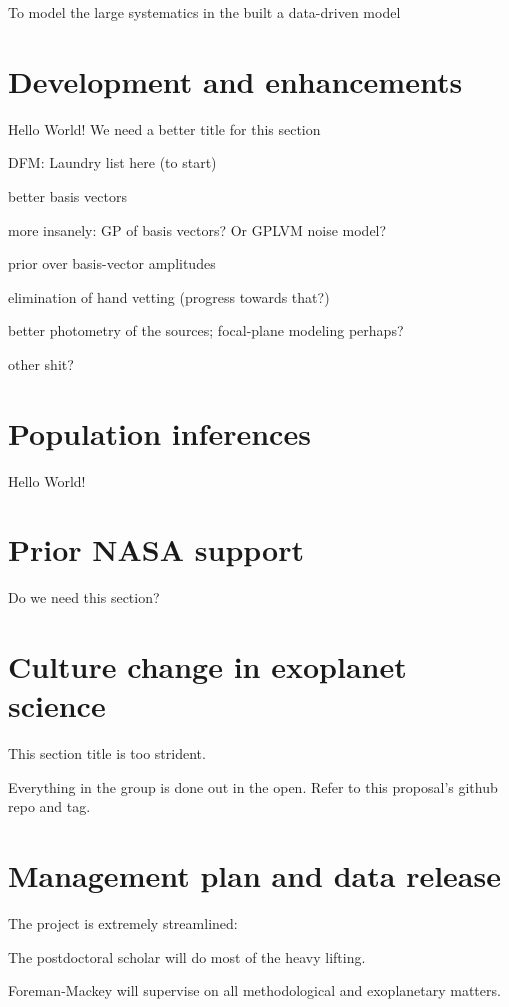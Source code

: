 \documentclass[12pt,preprint]{aastex}
\begin{document}
To model the large systematics in the
\citet{Foreman-Mackey:2015} built a data-driven model

\section{Development and enhancements}

Hello World!  We need a better title for this section

DFM:  Laundry list here (to start)

better basis vectors

more insanely: GP of basis vectors?  Or GPLVM noise model?

prior over basis-vector amplitudes

elimination of hand vetting (progress towards that?)

better photometry of the sources; focal-plane modeling perhaps?

other shit?

\section{Population inferences}

Hello World!

\section{Prior NASA support}

Do we need this section?

\section{Culture change in exoplanet science}

This section title is too strident.

Everything in the group is done out in the open.
Refer to this proposal's github repo and tag.

\section{Management plan and data release}

The project is extremely streamlined:

The postdoctoral scholar will do most of the heavy lifting.

Foreman-Mackey will supervise on all methodological and exoplanetary
matters.
\end{document}

